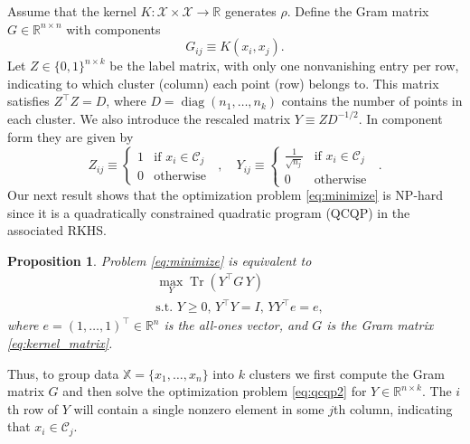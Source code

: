 \documentclass{article}
\newtheorem{proposition}[theorem]{Proposition}
\DeclareMathOperator{\diag}{diag}
\DeclareMathOperator{\Tr}{Tr}
\newcommand\kk{K}
\newcommand\C{{\mathcal{C}}}
\newcommand\Zt{Y}
\newcommand\e{e}
\begin{document}
Assume that the kernel $\kk: \mathcal{X} \times \mathcal{X} \to \mathbb{R}$ 
generates $\rho$.  Define  the Gram matrix $G \in \mathbb{R}^{n\times n}$ 
with components
\begin{equation}
\label{eq:kernel_matrix}
G_{ij} \equiv \kk(x_i,x_j).
\end{equation}
Let $Z \in \{ 0,1 \}^{n\times k}$ be the label matrix, 
with only one nonvanishing entry per row, 
indicating to which cluster (column)
each point (row) belongs to. This matrix satisfies
$Z^\top Z = D$, where  
$D = \diag( n_1,\dotsc, n_k )$  contains
the number of points in each cluster. We also introduce the rescaled
matrix  $Y \equiv Z D^{-1/2}$. In component form they are given by
\begin{equation}
\label{eq:label_matrix}
Z_{ij} \equiv \begin{cases}
1 & \mbox{if $x_i \in \C_j$ } \\
0 & \mbox{otherwise}
\end{cases} , \quad
\Zt_{ij} \equiv \begin{cases}
\tfrac{1}{\sqrt{n_j}} & \mbox{if $x_i \in \C_j$ } \\
0 & \mbox{otherwise}
\end{cases} .
\end{equation}
Our next result shows that the optimization problem \eqref{eq:minimize}
is NP-hard since
it is a quadratically constrained quadratic program (QCQP) in the 
associated RKHS.

\begin{proposition} 
\label{th:qcqp2}
Problem \eqref{eq:minimize} is equivalent to
\begin{equation}
\label{eq:qcqp2}
\begin{split}
&\max_{\Zt} \Tr \left( \Zt^\top G \, \Zt \right) \\
&\mbox{s.t. $\Zt \ge 0$, $\Zt^\top \Zt = I$, 
$\Zt \Zt^\top \e = \e$},
\end{split}
\end{equation}
where $\e = (1,\dots,1)^\top \in \mathbb{R}^n$ is the all-ones vector,
and $G$ is the Gram matrix \eqref{eq:kernel_matrix}.
\end{proposition}

Thus, to group data
$\mathbb{X} = \{ x_1,\dotsc,x_n \}$
into  $k$ clusters we first compute the Gram matrix
$G$ and then 
solve the optimization problem \eqref{eq:qcqp2} for $\Zt \in
\mathbb{R}^{n\times k}$. The $i$th row
of $\Zt$ will contain a single nonzero element in some $j$th column,
indicating that $x_i \in \C_j$. 
\end{document}
